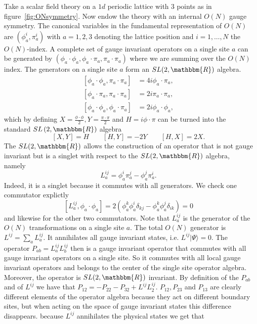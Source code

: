 \documentclass{PoS}
\newcommand{\ket}[1]{|#1\rangle}
\newcommand{\LF}{\left(}
\newcommand{\RF}{\right)}
\newcommand{\LT}{\left[}
\newcommand{\RT}{\right]}
\begin{document}
Take a scalar field theory on a $1d$ periodic lattice with $3$ points as in figure~\ref{fig:ONsymmetry}. Now endow the theory with an internal $O(N)$ gauge symmetry. The canonical variables in the fundamental representation of $O(N)$ are $(\phi^i_a,\pi^i_a)$ with $a=1,2,3$ denoting the lattice position and $i=1,\ldots,N$ the $O(N)$-index. A complete set of gauge invariant operators on a single site $a$ can be generated by $( \phi_a\cdot \phi_a, \phi_a\cdot\pi_a,\pi_a\cdot\pi_a)$ where we are summing over  the $O(N)$ index. The generators on a single site $a$ form an $SL(2,\mathbbm{R})$ algebra.
\begin{align}
\LT \phi_a\cdot\phi_a, \pi_a\cdot\pi_a\RT &= 4i\phi_a\cdot\pi_a,\\
\LT \phi_a\cdot\pi_a, \pi_a\cdot\pi_a\RT &= 2i\pi_a\cdot\pi_a,\\
\LT \phi_a\cdot\phi_a, \phi_a\cdot\pi_a\RT &= 2i\phi_a\cdot\phi_a,
\end{align}
which by defining $X = \frac{\phi\cdot\phi}{2}, Y= \frac{\pi\cdot\pi}{2}$ and $H= i\phi\cdot\pi$ can be turned into the standard $SL \LF 2,\mathbbm{R}\RF$ algebra
\begin{equation}
\LT X,Y\RT = H \qquad \LT H,Y\RT = -2Y \qquad \LT H,X\RT = 2X.
\end{equation}
The $SL(2,\mathbbm{R})$ allows the construction of an operator that is not gauge invariant but is a singlet with respect to the $SL(2,\mathbbm{R})$ algebra, namely
\begin{equation}
L^{ij}_a = \phi^i_a\pi^j_a - \phi^j_a\pi^i_a.
\end{equation}
Indeed, it is a singlet because it commutes with all generators. We check one commutator explictly
\begin{equation}
\LT L^{ij}_a,\phi_a\cdot\phi_a\RT = 2\LF \phi^k_a \phi^i_a \delta_{kj} - \phi^k_a\phi^j_a\delta_{ik}\RF = 0
\end{equation}
and likewise for the other two commutators. Note that $L^{ij}_a$ is the generator of the $O(N)$ transformations on a single site $a$. The total $O(N)$ generator is $L^{ij} = \sum\limits_a L^{ij}_a$. It annihilates all gauge invariant states, i.e. $L^{ij}\ket{\Psi}=0$. The operator $P_{ab} = L^{ij}_a L^{ij}_b$  then is a gauge invariant operator that commutes with all gauge invariant operators on a single site. So it commutes with all local gauge invariant operators and belongs to the center of the single site operator algebra. Moreover, the operator is $SL(2,\mathbbm{R})$ invariant. By definition of the $P_{ab}$ and of $L^{ij}$ we have that $P_{12} = -P_{22}-P_{32} + L^{ij}L^{ij}_2$. $P_{12},P_{23}$ and $P_{13}$ are clearly different elements of the operator algebra because they act on different boundary sites, but when acting on the space of gauge invariant states this difference disappears. because $L^{ij}$ annihilates the physical states we get that 
\end{document}
